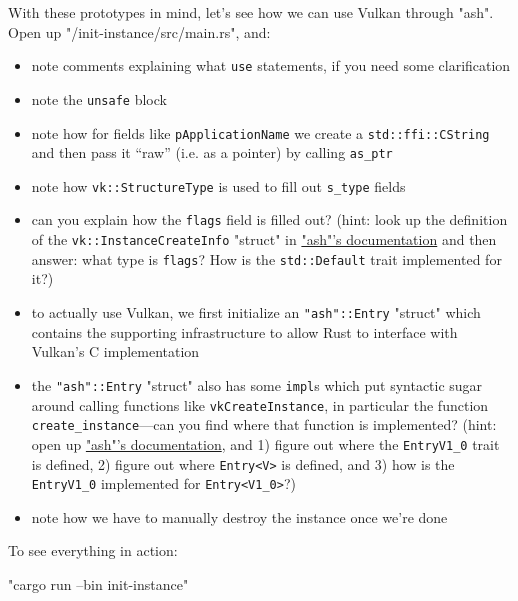 \documentclass[12pt,letterpaper]{article}
\newcommand{\inquotes}[1]{``#1''}	%
\newcommand{\ril}[1]{\texttt{#1}}
\newcommand{\cil}[1]{\texttt{#1}}
\begin{document}
	With these prototypes in mind, let's see how we can use Vulkan through "ash". Open up "/init-instance/src/main.rs", and:
		\begin{itemize}
			\item note comments explaining what \ril{use} statements, if you need some clarification
			
			\item note the \ril{unsafe} block
			
			\item note how for fields like \cil{pApplicationName} we create a \ril{std::ffi::CString} and then pass it \inquotes{raw} (i.e. as a pointer) by calling \ril{as_ptr}
			
			\item note how \ril{vk::StructureType} is used to fill out \ril{s_type} fields
			
			\item can you explain how the \ril{flags} field is filled out? (hint: look up the definition of the \ril{vk::InstanceCreateInfo} "struct" in \href{https://docs.rs/"ash"}{"ash"'s documentation} and then answer: what type is \ril{flags}? How is the \ril{std::Default} trait implemented for it?)
			
			\item to actually use Vulkan, we first initialize an \ril{"ash"::Entry} "struct" which contains the supporting infrastructure to allow Rust to interface with Vulkan's C implementation
			
			\item the \ril{"ash"::Entry} "struct" also has some \ril{impl}s which put syntactic sugar around calling functions like \ril{vkCreateInstance}, in particular the function \ril{create_instance}---can you find where that function is implemented? (hint: open up \href{https://docs.rs/"ash"}{"ash"'s documentation}, and 1) figure out where the \ril{EntryV1_0} trait is defined, 2) figure out where \ril{Entry<V>} is defined, and 3) how is the \ril{EntryV1_0} implemented for \ril{Entry<V1_0>}?)
			
			\item note how we have to manually destroy the instance once we're done
		\end{itemize} 
	
	To see everything in action: 
		\begin{center}
			"cargo run --bin init-instance"
		\end{center}
	
\end{document}
